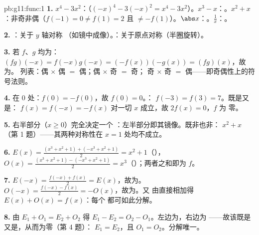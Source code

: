 \begin{solution}{pb:g11:func:1}
\textbf{1.} $x^4 - 3x^2$：（$(-x)^4 - 3(-x)^2 = x^4 -
3x^2$）。$x^3 - x$：。$x^2 + x$：非奇非偶（$f(-1) = 0 \neq
f(1) = 2$ 且 $\neq -f(1)$）。$\abs x$：。$\frac1x$：。

\textbf{2.} ：关于 $y$ 轴对称
（如镜中成像）。：关于原点对称（半圈旋转）。

\textbf{3.} 若 $f$、$g$ 均为：
$(fg)(-x) = f(-x)g(-x) = (-f(x))(-g(x)) = (fg)(x)$，故为。
列表：偶 $\times$ 偶 $=$ 偶；偶 $\times$ 奇 $=$ 奇；
奇 $\times$ 奇 $=$ 偶——即奇偶性上的符号法则。

\textbf{4.} 在 $0$ 处：$f(0) = -f(0)$，故 $f(0) = 0$。：
$f(-3) = f(3) = 7$。既是又是：
$f(x) = f(-x) = -f(x)$ 对一切 $x$ 成立，故 $2f(x) = 0$，$f$ 为
零。

\textbf{5.} 右半部分（$x \geq 0$）完全决定一个
：左半部分即其镜像。既非也非：
$x^2 + x$（第 1 题）——其两种对称性在
$x = 1$ 处均不成立。

\textbf{6.} $E(x) = \frac{(x^3 + x^2 + 1) + (-x^3 + x^2 +
1)}{2} = x^2 + 1$（），$O(x) = \frac{(x^3 + x^2 + 1) -
(-x^3 + x^2 + 1)}{2} = x^3$（）；两者之和即为 $f$。

\textbf{7.} $E(-x) = \frac{f(-x) + f(x)}{2} = E(x)$，故为。
$O(-x) = \frac{f(-x) - f(x)}{2} = -O(x)$，故为。又
由直接相加得 $E(x) + O(x) = f(x)$：每个
都可如此分解。

\textbf{8.} 由 $E_1 + O_1 = E_2 + O_2$ 得
$E_1 - E_2 = O_2 - O_1$。左边为，右边为
——故该既是又是，从而为零（第 4 题）：
$E_1 = E_2$，且 $O_1 = O_2$。分解唯一。


\end{solution}
